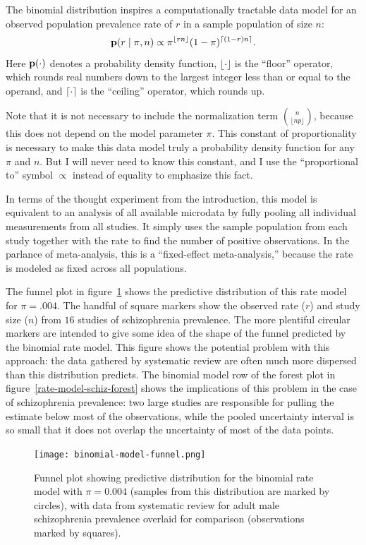 The binomial distribution inspires a computationally tractable
data model for an observed population prevalence rate of
$r$ in a sample population of size $n$:
\[
\mathbf{p}(r\;|\; \pi, n) \propto \pi^{\lfloor rn \rfloor}(1-\pi)^{\lceil (1-r)n \rceil}.
\]
Here $\mathbf{p}(\cdot)$ denotes a probability density function, $\lfloor
\cdot \rfloor$ is the ``floor'' operator, which rounds real numbers
down to the largest integer less than or equal to the operand, and
$\lceil \cdot \rceil$ is the ``ceiling'' operator, which rounds up.

Note that it is not necessary to include the normalization term
$\binom{n}{\lfloor np\rfloor}$, because this does not depend on the
model parameter $\pi$. This constant of proportionality is necessary
to make this data model truly a probability density function for any
$\pi$ and $n$. But I will never need to know this constant, and I use
the ``proportional to'' symbol $\propto$ instead of equality to
emphasize this fact.

In terms of the thought experiment from the introduction, this model
is equivalent to an analysis of all available microdata by fully
pooling all individual measurements from all studies.  It simply
uses the sample population from each study together with the rate to
find the number of positive observations.  In the parlance of
meta-analysis, this is a ``fixed-effect meta-analysis,'' because the
rate is modeled as fixed across all populations.\cite{borenstein_introduction_2011}

The funnel plot in figure~\ref{rate-model-binom-funnel} shows the
predictive distribution of this rate model for $\pi=.004$.  The
handful of square markers show the observed rate ($r$) and study size
($n$) from $16$ studies of schizophrenia prevalence. The more
plentiful circular markers are intended to give some idea of the shape
of the funnel predicted by the binomial rate model.  This figure shows
the potential problem with this approach: the data gathered by
systematic review are often much more dispersed than this distribution
predicts.  The binomial model row of the forest plot in
figure~\ref{rate-model-schiz-forest} shows the implications of this
problem in the case of schizophrenia prevalence: two large studies are
responsible for pulling the estimate below most of the observations,
while the pooled uncertainty interval is so small that it does not
overlap the uncertainty of most of the data points.


\begin{figure}[ht]
\begin{center}
\texttt{[image: binomial-model-funnel.png]}
\end{center}
\caption[Funnel plot for the binomial rate model.]{Funnel plot
  showing predictive distribution for the binomial
  rate model with $\pi=0.004$ (samples from this distribution are
  marked by circles), with data from systematic review for adult male
  schizophrenia prevalence overlaid for comparison (observations
  marked by squares).}
\label{rate-model-binom-funnel}
\end{figure}

